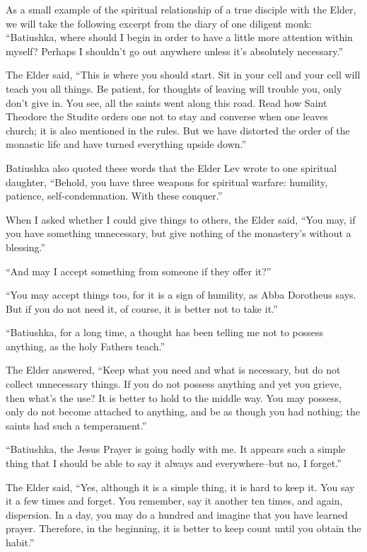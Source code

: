 \begin{longquote}{As a small example of the spiritual relationship of a true disciple with the Elder, we will take the following excerpt from the diary of one diligent monk:}
``Batiushka, where should I begin in order to have a little more attention within myself? Perhaps I shouldn't go out anywhere unless it's absolutely necessary.''

The Elder said, ``This is where you should start. Sit in your cell and your cell will teach you all things. Be patient, for thoughts of leaving will trouble you, only don't give in. You see, all the saints went along this road. Read how Saint Theodore the Studite orders one not to stay and converse when one leaves church; it is also mentioned in the rules. But we have distorted the order of the monastic life and have turned everything upside down.''

Batiushka also quoted these words that the Elder Lev wrote to one spiritual daughter, ``Behold, you have three weapons for spiritual warfare: humility, patience, self-condemnation. With these conquer.''

When I asked whether I could give things to others, the Elder said, ``You may, if you have something unnecessary, but give nothing of the monastery's without a blessing.''

``And may I accept something from someone if they offer it?''

``You may accept things too, for it is a sign of humility, as Abba Dorotheus says. But if you do not need it, of course, it is better not to take it.''

``Batiushka, for a long time, a thought has been telling me not to possess anything, as the holy Fathers teach.''

The Elder answered, ``Keep what you need and what is necessary, but do not collect unnecessary things. If you do not possess anything and yet you grieve, then what's the use? It is better to hold to the middle way. You may possess, only do not become attached to anything, and be as though you had nothing; the saints had such a temperament.''

``Batiushka, the Jesus Prayer is going badly with me. It appears such a simple thing that I should be able to say it always and everywhere--but no, I forget.''

The Elder said, ``Yes, although it is a simple thing, it is hard to keep it. You say it a few times and forget. You remember, say it another ten times, and again, dispersion. In a day, you may do a hundred and imagine that you have learned prayer. Therefore, in the beginning, it is better to keep count until you obtain the habit.''


\end{longquote}
